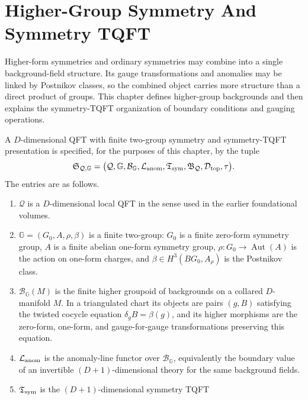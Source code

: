 \chapter{Higher-Group Symmetry And Symmetry TQFT}
\label{ch:global-higher-group-symmetry-tft}

\ConventionsMixed

Higher-form symmetries and ordinary symmetries may combine into a single
background-field structure.  Its gauge transformations and anomalies may be
linked by Postnikov classes, so the combined object carries more structure
than a direct product of groups.  This chapter defines higher-group
backgrounds and then explains the symmetry-TQFT organization of boundary
conditions and gauging operations.

\begin{hypothesis}
\label{hyp:higher-group-symmetry-tft-datum}
A \(D\)-dimensional QFT with finite two-group symmetry and symmetry-TQFT
presentation is specified, for the purposes of this chapter, by the tuple
\[
  \mathfrak S_{\mathcal Q,\mathbb G}
  =
  \bigl(
    \mathcal Q,\mathbb G,\mathcal B_{\mathbb G},
    \mathcal L_{\rm anom},
    \mathfrak T_{\rm sym},\mathfrak B_{\mathcal Q},
    \mathcal D_{\rm top},\tau
  \bigr).
\]
The entries are as follows.
\begin{enumerate}[label=\textnormal{(\roman*)}]
\item \(\mathcal Q\) is a \(D\)-dimensional local QFT in the sense used in the
  earlier foundational volumes.
\item \(\mathbb G=(G_0,A,\rho,\beta)\) is a finite two-group: \(G_0\) is a
  finite zero-form symmetry group, \(A\) is a finite abelian one-form symmetry
  group, \(\rho:G_0\to\operatorname{Aut}(A)\) is the action on one-form
  charges, and \(\beta\in H^3(BG_0,A_\rho)\) is the Postnikov class.
\item \(\mathcal B_{\mathbb G}(M)\) is the finite higher groupoid of
  backgrounds on a collared \(D\)-manifold \(M\).  In a triangulated chart its
  objects are pairs \((g,B)\) satisfying the twisted cocycle equation
  \(\delta_g B=\beta(g)\), and its higher morphisms are the zero-form,
  one-form, and gauge-for-gauge transformations preserving this equation.
\item \(\mathcal L_{\rm anom}\) is the anomaly-line functor over
  \(\mathcal B_{\mathbb G}\), equivalently the boundary value of an invertible
  \((D+1)\)-dimensional theory for the same background fields.
\item \(\mathfrak T_{\rm sym}\) is the \((D+1)\)-dimensional symmetry TQFT

\end{enumerate}
\end{hypothesis}
